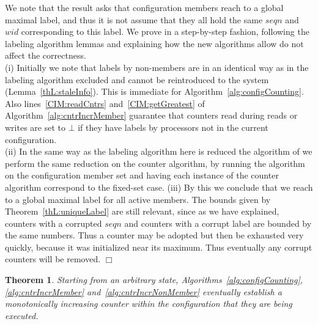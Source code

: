 \documentclass[11pt]{article}
\newtheorem{theorem}{Theorem}[section]
\newenvironment{proof}{\noindent{\bf Proof.}}{\hfill$\Box$}
\begin{document}
\begin{proof}
We note that the result asks that configuration members reach to a global maximal label, and thus it is not assume that they all hold the same $seqn$ and $wid$ corresponding to this label.
We prove in a step-by-step fashion, following the labeling algorithm lemmas and explaining how the new algorithms allow do not affect the correctness.\\
\noindent (i) Initially we note that labels by non-members are in an identical way as in the labeling algorithm excluded and cannot be reintroduced to the system (Lemma~\ref{thL:staleInfo}).
This is immediate for Algorithm~\ref{alg:configCounting}.
Also lines~\ref{CIM:readCntrs} and~\ref{CIM:getGreatest} of Algorithm~\ref{alg:cntrIncrMember} guarantee that counters read during reads or writes are set to $\bot$ if they have labels by processors not in the current configuration.\\
\noindent (ii) In the same way as the labeling algorithm here is reduced the algorithm of \cite{SSVS} we perform the same reduction on the counter algorithm, by running the algorithm on the configuration member set and having each instance of the counter algorithm correspond to the fixed-set case.
\noindent (iii) By this we conclude that we reach to a global maximal label for all active members.
The bounds given by Theorem~\ref{thL:uniqueLabel} are still relevant, since as we have explained, counters with a corrupted $seqn$ and counters with a corrupt label are bounded by the same numbers.
Thus a counter may be adopted but then be exhausted very quickly, because it was initialized near its maximum.
Thus eventually any corrupt counters will be removed.
\end{proof}

\begin{theorem}
\label{thCNT:finalApp}
Starting from an arbitrary state, Algorithms~\ref{alg:configCounting}, \ref{alg:cntrIncrMember} and~\ref{alg:cntrIncrNonMember} eventually establish a monotonically increasing counter within the configuration that they are being executed.
\end{theorem}
\end{document}
